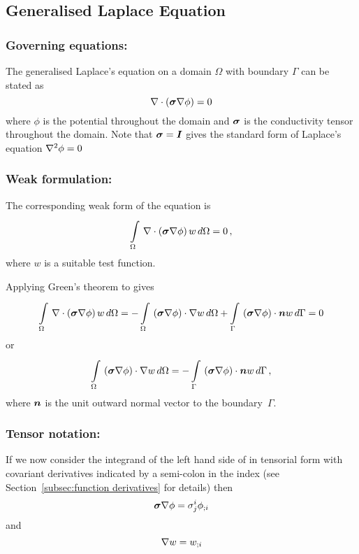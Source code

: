 \subsection{Generalised Laplace Equation}

\subsubsection{Governing equations:}
The generalised Laplace's equation on a domain $\Omega$ with boundary $\Gamma$
can be stated as
\begin{equation}
   \nabla\cdot\left( \boldsymbol{\sigma}\nabla\phi \right) =0
  \label{eqn:Laplacesequation}
\end{equation}
where $\phi$ is the potential throughout the domain and $\boldsymbol{\sigma}$ is
the conductivity tensor throughout the domain. Note that 
$\boldsymbol{\sigma}=\boldsymbol{I}$ gives the standard form of Laplace's equation \ie $\nabla^{2} {\phi}=0$

\subsubsection{Weak formulation:}
The corresponding weak form of the equation  is
\begin{equation}
    \displaystyle\int\limits_{\Omega}^{} \, \nabla\cdot\left( \boldsymbol{\sigma}\nabla\phi \right) w\,d\Omega =0 \,,
  \label{eqn:Laplaceweakform}
\end{equation}
where $w$ is a suitable test function.

Applying Green's theorem to  gives
\begin{equation}
 \gint{\Omega}{}{\diverg{\pbrac{\tensor{\sigma}\grad\phi}}w}{\Omega}
 = -\gint{\Omega}{}{\dotprod{\pbrac{\tensor{\sigma}\grad\phi}}{\grad w}}{\Omega}
   +\gint{\Gamma}{}{\dotprod{\pbrac{\tensor{\sigma}\grad\phi}}{\vect{n}}w}{\Gamma}
 = 0
\end{equation}
or
\begin{equation}
  \gint{\Omega}{}{\dotprod{\pbrac{\tensor{\sigma}\grad\phi}}{\grad w}}{\Omega}
  = -\gint{\Gamma}{}{\dotprod{\pbrac{\tensor{\sigma}\grad\phi}}{\vect{n}w}}{\Gamma} \,,
  \label{eqn:Laplaceweightedresidualform}
\end{equation}
where $\vect{n}$ is the unit outward normal vector to the boundary~$\Gamma$.


\subsubsection{Tensor notation:}
If we now consider the integrand of the left hand side of
 in tensorial form with covariant
derivatives indicated by a semi-colon in the index
(see Section~\ref{subsec:function derivatives} for details) then
\begin{equation}
  \boldsymbol{\sigma}\nabla\phi = \sigma^{i}_{j} {\phi}_{;i} 
  \label{eqn:Laplace weak form factor1}
\end{equation}
and
\begin{equation}
  \nabla w =  {w}_{;i} 
  \label{eqn:Laplace weak form factor2}
\end{equation}

